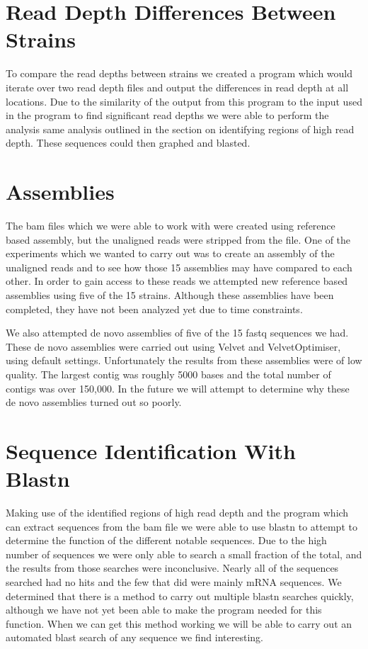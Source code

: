 \documentclass[12pt]{article}
\begin{document}
%
%
\section{Read Depth Differences Between Strains}
	To compare the read depths between strains we created a program which would iterate over two read depth files and output the differences in read depth at all locations. Due to the similarity of the output from this program to the input used in the program to find significant read depths we were able to perform the analysis same analysis outlined in the section on identifying regions of high read depth. These sequences could then graphed and blasted.

%
%
\section{Assemblies}
	The bam files which we were able to work with were created using reference based assembly, but the unaligned reads were stripped from the file. One of the experiments which we wanted to carry out was to create an assembly of the unaligned reads and to see how those 15 assemblies may have compared to each other. In order to gain access to these reads we attempted new reference based assemblies using five of the 15 strains. Although these assemblies have been completed, they have not been analyzed yet due to time constraints.

	We also attempted de novo assemblies of five of the 15 fastq sequences we had. These de novo assemblies were carried out using Velvet and VelvetOptimiser, using default settings. Unfortunately the results from these assemblies were of low quality. The largest contig was roughly 5000 bases and the total number of contigs was over 150,000. In the future we will attempt to determine why these de novo assemblies turned out so poorly.

%
%
\section{Sequence Identification With Blastn}
	Making use of the identified regions of high read depth and the program which can extract sequences from the bam file we were able to use blastn to attempt to determine the function of the different notable sequences. Due to the high number of sequences we were only able to search a small fraction of the total, and the results from those searches were inconclusive. Nearly all of the sequences searched had no hits and the few that did were mainly mRNA sequences. We determined that there is a method to carry out multiple blastn searches quickly, although we have not yet been able to make the program needed for this function. When we can get this method working we will be able to carry out an automated blast search of any sequence we find interesting.   
\end{document}

